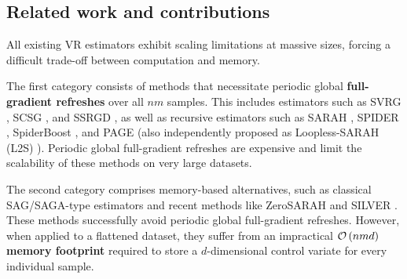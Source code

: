 \documentclass{article}
\newcommand{\cO}{{\cal O}}
\newcommand{\rb}[1]{\left(#1\right)}
\theoremstyle{plain}
\newcommand{\algname}[1]{{\sf\scalefont{0.88}\color{mydarkgreen}#1}\xspace}
\def\algname#1{#1}%
\begin{document}
\subsection{Related work and contributions}

All existing VR estimators exhibit scaling limitations at massive sizes, forcing a difficult trade-off between computation and memory. 

The first category consists of methods that necessitate periodic global \textbf{full-gradient refreshes} over all $nm$ samples.
This includes estimators such as \algname{SVRG} \citep{johnson2013accelerating,kovalev2020don}, \algname{SCSG} \citep{lei2017non}, and \algname{SSRGD} \citep{li2019ssrgd}, as well as recursive estimators such as \algname{SARAH}  \citep{ngu17},
 \algname{SPIDER} \citep{fang2018spider}, \algname{SpiderBoost} \citep{wang2018spiderboost}, and \algname{PAGE} \citep{li21, PAGE-AB} (also independently proposed as Loopless-SARAH (\algname{L2S})
 \citep{li20b}). Periodic global full-gradient refreshes are expensive and limit the scalability of these methods on very large datasets.

The second category comprises memory-based alternatives, such as classical \algname{SAG}/\algname{SAGA}-type estimators \citep{schmidt2017minimizing, defazio2014saga, bibi2018improving, demidovich2024guide} and recent methods like \algname{ZeroSARAH} \citep{li2021zerosarah} and \algname{SILVER} \citep{oko24}. These methods successfully avoid periodic global full-gradient refreshes. However, when applied to a flattened dataset, they suffer from an impractical \textbf{$\cO\rb{nmd}$ memory footprint} required to store a $d$-dimensional control variate for every individual sample. 
\end{document}
